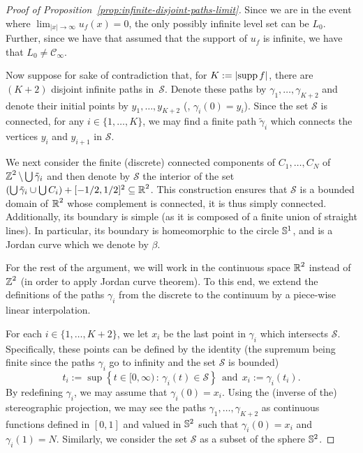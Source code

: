 \documentclass[12pt]{amsart}
\numberwithin{equation}{section}
\begin{document}
	\begin{proof}[Proof of Proposition~\ref{prop:infinite-disjoint-paths-limit}]
		
		
		
		
		Since we are in the event where  $\lim_{|x| \to \infty} u_f(x) = 0$, the only
		possibly infinite level set can be $L_0$. Further, since we have that assumed that the support of $u_f$ is infinite,  we have that $L_0 \neq \mathscr{C}_{\infty}$.
		
		Now suppose for sake of contradiction that, for $K := \left| \supp f \right|$, there are $(K+2)$ disjoint infinite paths in~$\mathcal{S}$. Denote these paths by $\gamma_1 , \ldots, \gamma_{K+2}$ and denote their initial points by $y_1 , \ldots, y_{K+2}$ (\ie, $\gamma_i(0) = y_i$). Since the set $\mathcal{S}$ is connected, for any $i \in \{1 , \ldots, K \}$, we may find a finite path $\tilde \gamma_i$ which connects the vertices $y_i$ and $y_{i+1}$ in $\mathcal{S}$. 
		
		We next consider the finite (discrete) connected components of $C_1 , \ldots, C_N$ of $\Z^2 \setminus \bigcup \tilde \gamma_i$ and then denote by $\mathscr{S}$ the interior of the set $(\bigcup \tilde \gamma_i \cup \bigcup C_i) + [- 1/2 , 1/2]^2 \subseteq \R^2$. This construction ensures that $\mathscr{S}$ is a bounded domain of $\R^2$ whose complement is connected, it is thus simply connected. Additionally, its boundary is simple (as it is composed of a finite union of straight lines). In particular, its boundary is homeomorphic to the circle $\S^1$, and is a Jordan curve which we denote by $\beta$.
		
		
		For the rest of the argument, we will work in the continuous space $\R^2$ instead of $\Z^2$ (in order to apply Jordan curve theorem). To this end, we extend the definitions of the paths $\gamma_i$ from the discrete to the continuum by a piece-wise linear interpolation.
		
		
		For each $i \in \{ 1 , \ldots, K+2\}$, we let $x_i$ be the last point in $\gamma_i$ which intersects $\mathscr{S}$. Specifically, these points can be defined by the identity (the supremum being finite since the paths $\gamma_i$ go to infinity and the set $\mathscr{S}$ is bounded)
		\begin{equation*}
			t_i := \sup \left\{ t \in [0 , \infty) \, : \, \gamma_i(t) \in \mathscr{S} \right\} ~~\mbox{and}~~ x_i := \gamma_i(t_i).   
		\end{equation*}
		By redefining $\gamma_i$, we may assume that $\gamma_i(0) = x_i$. Using the (inverse of the) stereographic projection, we may see the paths $\gamma_1, \ldots, \gamma_{K+2}$ as continuous functions defined in $[0 , 1]$ and valued in $\S^2$ such that $\gamma_i(0) = x_i$ and $\gamma_i(1) = N$. Similarly, we consider the set $\mathscr{S}$ as a subset of the sphere $\S^2$.
		

\end{proof}
\end{document}
